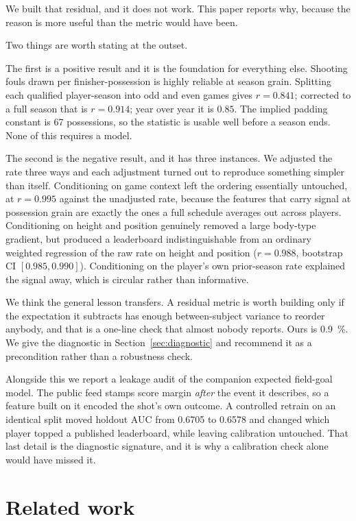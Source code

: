 \documentclass[11pt,a4paper]{article}
\begin{document}
We built that residual, and it does not work. This paper reports why, because
the reason is more useful than the metric would have been.

Two things are worth stating at the outset.

The first is a positive result and it is the foundation for everything else.
Shooting fouls drawn per finisher-possession is highly reliable at season grain.
Splitting each qualified player-season into odd and even games gives
$r = 0.841$; corrected to a full season that is $r = 0.914$; year over year it
is $0.85$. The implied padding constant is 67 possessions, so the statistic is
usable well before a season ends. None of this requires a model.

The second is the negative result, and it has three instances. We adjusted the
rate three ways and each adjustment turned out to reproduce something simpler
than itself. Conditioning on game context left the ordering essentially
untouched, at $r = 0.995$ against the unadjusted rate, because the features that
carry signal at possession grain are exactly the ones a full schedule averages
out across players. Conditioning on height and position genuinely removed a
large body-type gradient, but produced a leaderboard indistinguishable from an
ordinary weighted regression of the raw rate on height and position
($r = 0.988$, bootstrap CI $[0.985, 0.990]$). Conditioning on the player's own
prior-season rate explained the signal away, which is circular rather than
informative.

We think the general lesson transfers. A residual metric is worth building only
if the expectation it subtracts has enough between-subject variance to reorder
anybody, and that is a one-line check that almost nobody reports. Ours is
\SI{0.9}{\percent}. We give the diagnostic in Section~\ref{sec:diagnostic} and
recommend it as a precondition rather than a robustness check.

Alongside this we report a leakage audit of the companion expected field-goal
model. The public feed stamps score margin \emph{after} the event it describes,
so a feature built on it encoded the shot's own outcome. A controlled retrain on
an identical split moved holdout AUC from 0.6705 to 0.6578 and changed which
player topped a published leaderboard, while leaving calibration untouched. That
last detail is the diagnostic signature, and it is why a calibration check alone
would have missed it.

\section{Related work}
\end{document}
